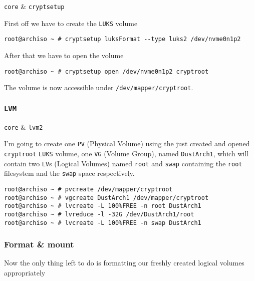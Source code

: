 \documentclass[10pt]{dustdoc}
\begin{document}
\begin{packagetable}
    \texttt{core} & \texttt{cryptsetup} \\
\end{packagetable}

First off we have to create the \texttt{LUKS} volume

\begin{verbatim}
root@archiso ~ # cryptsetup luksFormat --type luks2 /dev/nvme0n1p2
\end{verbatim}

After that we have to open the volume

\begin{verbatim}
root@archiso ~ # cryptsetup open /dev/nvme0n1p2 cryptroot
\end{verbatim}

The volume is now accessible under \texttt{/dev/mapper/cryptroot}.

\subsubsection{\texttt{LVM}}
\label{sec:lvm}

\begin{packagetable}
    \texttt{core} & \texttt{lvm2} \\
\end{packagetable}

I’m going to create one \texttt{PV} (Physical Volume) using the just created and opened \texttt{cryptroot} \texttt{LUKS} volume, one \texttt{VG} (Volume Group), named \texttt{DustArch1}, which will contain two \texttt{LV}s (Logical Volumes) named \texttt{root} and \texttt{swap} containing the \texttt{root} filesystem and the \texttt{swap} space respectively.

\begin{verbatim}
root@archiso ~ # pvcreate /dev/mapper/cryptroot
root@archiso ~ # vgcreate DustArch1 /dev/mapper/cryptroot
root@archiso ~ # lvcreate -L 100%FREE -n root DustArch1
root@archiso ~ # lvreduce -l -32G /dev/DustArch1/root
root@archiso ~ # lvcreate -L 100%FREE -n swap DustArch1
\end{verbatim}

\subsubsection{Format \& mount}
\label{sec:format-and-mount}

Now the only thing left to do is formatting our freshly created logical volumes appropriately
\end{document}
